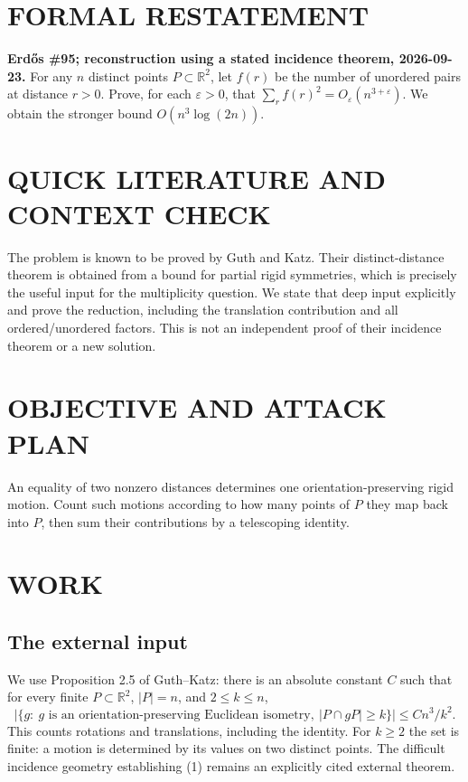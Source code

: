 \section{FORMAL RESTATEMENT}
\textbf{Erd\H{o}s \#95; reconstruction using a stated incidence theorem, 2026-09-23.}
For any $n$ distinct points $P\subset\mathbb R^2$, let $f(r)$ be the number of unordered pairs at distance $r>0$. Prove, for each $\varepsilon>0$, that $\sum_r f(r)^2=O_\varepsilon(n^{3+\varepsilon})$. We obtain the stronger bound $O(n^3\log(2n))$.

\section{QUICK LITERATURE AND CONTEXT CHECK}
The problem is known to be proved by Guth and Katz. Their distinct-distance theorem is obtained from a bound for partial rigid symmetries, which is precisely the useful input for the multiplicity question. We state that deep input explicitly and prove the reduction, including the translation contribution and all ordered/unordered factors. This is not an independent proof of their incidence theorem or a new solution.

\section{OBJECTIVE AND ATTACK PLAN}
An equality of two nonzero distances determines one orientation-preserving rigid motion. Count such motions according to how many points of $P$ they map back into $P$, then sum their contributions by a telescoping identity.

\section{WORK}
\subsection{The external input}
We use Proposition 2.5 of Guth--Katz: there is an absolute constant $C$ such that for every finite $P\subset\mathbb R^2$, $|P|=n$, and $2\leq k\leq n$,
\[
|\{g:\ g\text{ is an orientation-preserving Euclidean isometry},\ |P\cap gP|\geq k\}|\leq Cn^3/k^2.
\tag{1}
\]
This counts rotations and translations, including the identity. For $k\geq2$ the set is finite: a motion is determined by its values on two distinct points. The difficult incidence geometry establishing (1) remains an explicitly cited external theorem.

